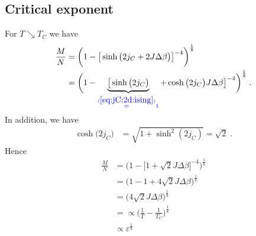 \subsection{Critical exponent \label{sec:Ising:2D:beta}}
For  $T\searrow T_{C}$ we have
%
\begin{align*}
\frac{M}{N} &= \bigg( 1 - \big[\sinh\big( 2 j_{C} + 2J\Delta \beta  \big)\big]^{-4} \bigg)^{\frac{1}{8}}\\
&= \bigg( 1 - \underbrace{
\big[\sinh\big( 2 j_{C}\big)
}_{\color{blue} \overset{(\ref{eq:jC:2d:ising})}{=} 1} + \cosh\big(2j_{C}  \big) J\Delta \beta\big]^{-4} \bigg)^{\frac{1}{8}}\;.
\end{align*}
%
In addition, we have 
%
\begin{align*}
\cosh\big( 2 j_{C} \big) &= \sqrt{1+\sinh^{2}(2 j_{C})} = \sqrt{2}\;.
\end{align*}
%
Hence
%
\begin{align*}
\frac{M}{N} &=\bigg( 1 - \big[ 1 + \sqrt{2} J \Delta\beta \big]^{-4} \bigg)^{\frac{1}{8}}\\
&=\bigg( 1 - 1 +4\sqrt{2}  J \Delta\beta  \bigg)^{\frac{1}{8}}\\
&=\bigg(4\sqrt{2}  J \Delta\beta  \bigg)^{\frac{1}{8}}\\
&=\propto  \big(\frac{1}{T}-\frac{1}{T_{C}}\big)   ^{\frac{1}{8}}\\
&\propto \varepsilon^{\frac{1}{8}}
\end{align*}
%


